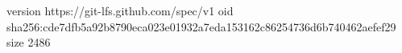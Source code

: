 version https://git-lfs.github.com/spec/v1
oid sha256:cde7dfb5a92b8790eca023e01932a7eda153162c86254736d6b740462aefef29
size 2486
